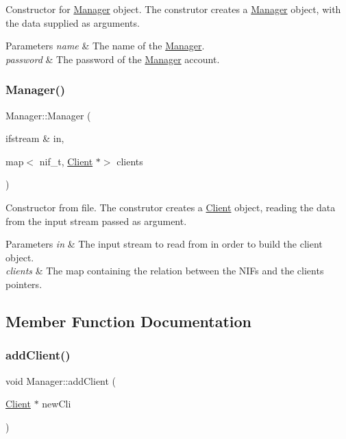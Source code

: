 Constructor for \hyperlink{class_manager}{Manager} object. The construtor creates a \hyperlink{class_manager}{Manager} object, with the data supplied as arguments. 
\begin{DoxyParams}{Parameters}
{\em name} & The name of the \hyperlink{class_manager}{Manager}. \\
\hline
{\em password} & The password of the \hyperlink{class_manager}{Manager} account. \\
\hline
\end{DoxyParams}
\hypertarget{class_manager_ab76e4433a39dda934759acd696aecaea}{}\label{class_manager_ab76e4433a39dda934759acd696aecaea} 
\subsubsection{\texorpdfstring{Manager()}{Manager()}\hspace{0.1cm}{\footnotesize\ttfamily [3/3]}}
{\footnotesize\ttfamily Manager\+::\+Manager (\begin{DoxyParamCaption}\item[{ifstream \&}]{in,  }\item[{map$<$ nif\+\_\+t, \hyperlink{class_client}{Client} $\ast$$>$}]{clients }\end{DoxyParamCaption})}

Constructor from file. The construtor creates a \hyperlink{class_client}{Client} object, reading the data from the input stream passed as argument. 
\begin{DoxyParams}{Parameters}
{\em in} & The input stream to read from in order to build the client object. \\
\hline
{\em clients} & The map containing the relation between the N\+I\+Fs and the clients\textquotesingle{} pointers. \\
\hline
\end{DoxyParams}


\subsection{Member Function Documentation}
\hypertarget{class_manager_a2c4d1978af9e2f99b4aa787973ce2c49}{}\label{class_manager_a2c4d1978af9e2f99b4aa787973ce2c49} 
\subsubsection{\texorpdfstring{add\+Client()}{addClient()}}
{\footnotesize\ttfamily void Manager\+::add\+Client (\begin{DoxyParamCaption}\item[{\hyperlink{class_client}{Client} $\ast$}]{new\+Cli }\end{DoxyParamCaption})}

